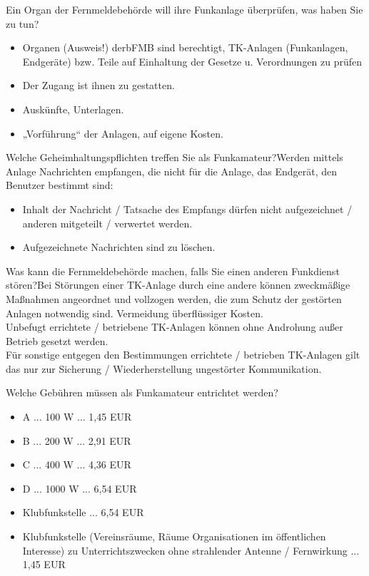 \documentclass[avery5371,grid,frame,a4paper]{flashcards}
\newcommand{\card}[3]{
  \begin{flashcard}[{\chap} -- #1]{#2}#3\end{flashcard}
}
\begin{document}
\card{14}{Ein Organ der Fernmeldebehörde will ihre Funkanlage überprüfen, was haben Sie zu tun?}{\begin{itemize}\itemsep1pt \item Organen (Ausweis!) derbFMB sind berechtigt, TK-Anlagen (Funkanlagen, Endgeräte) bzw. Teile auf Einhaltung der Gesetze u. Verordnungen zu prüfen \item Der Zugang ist ihnen zu gestatten. \item Auskünfte, Unterlagen. \item			„Vorführung“ der Anlagen, auf eigene Kosten. \end{itemize}}

\card{14}{ Welche Geheimhaltungspflichten treffen Sie als Funkamateur?}{Werden mittels Anlage Nachrichten empfangen, die nicht für die Anlage, das Endgerät, den Benutzer bestimmt sind:\begin{itemize}\itemsep1pt \item Inhalt der Nachricht / Tatsache des Empfangs dürfen nicht aufgezeichnet / anderen mitgeteilt / verwertet	werden. \item Aufgezeichnete Nachrichten sind zu löschen.\end{itemize}}

\card{16}{Was kann die Fernmeldebehörde machen, falls Sie einen anderen Funkdienst stören?}{Bei Störungen einer TK-Anlage durch eine andere können zweckmäßige Maßnahmen angeordnet und vollzogen werden, die zum Schutz der gestörten	Anlagen notwendig sind. Vermeidung überflüssiger Kosten. \\ Unbefugt errichtete / betriebene TK-Anlagen können ohne Androhung außer Betrieb gesetzt werden. \\ Für sonstige entgegen den Bestimmungen errichtete / betrieben TK-Anlagen gilt das nur zur Sicherung / Wiederherstellung ungestörter Kommunikation.}

\card{17}{Welche Gebühren müssen als Funkamateur entrichtet werden?}{\begin{itemize}\itemsep0pt \item	A ...   100 W ... 1,45 EUR \item	B ...   200 W ... 2,91 EUR \item C ...   400 W ... 4,36 EUR \item	D ... 1000 W ... 6,54 EUR \item Klubfunkstelle ... 6,54 EUR \item	Klubfunkstelle (Vereinsräume, Räume Organisationen im öffentlichen Interesse) zu Unterrichtszwecken ohne strahlender Antenne / Fernwirkung ... 1,45 EUR\end{itemize}}
\end{document}
